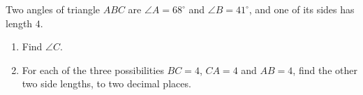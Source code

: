 Two angles of triangle $ABC$ are $\angle A=68^\circ$ and $\angle B=41^\circ$, and one of its sides has length $4$.
\begin{enumerate}
\item[(a)] Find $\angle C$.
\item[(b)] For each of the three possibilities $BC=4$, $CA=4$ and $AB=4$, find the other two side lengths, to two decimal places.
\end{enumerate}
